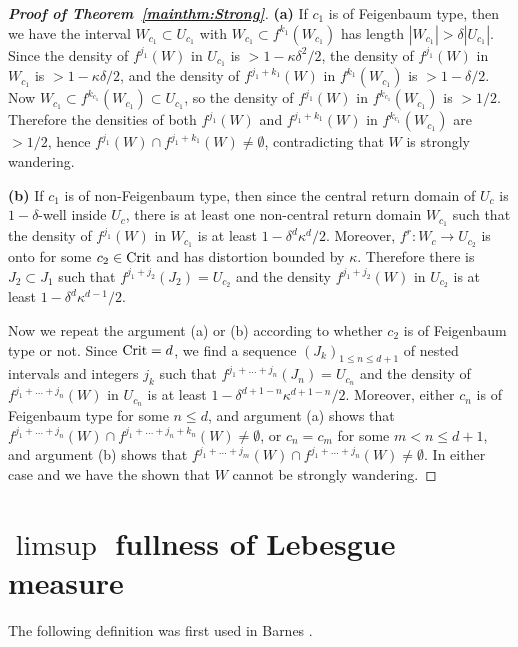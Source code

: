 \documentclass[12pt, psamsfonts, reqno]{amsart}
\begin{document}
\begin{proof}[\textbf{Proof of Theorem~\ref{mainthm:Strong}}]
{\bf (a)} If $c_1$ is of Feigenbaum type, then we have the
interval $W_{c_1} \subset U_{c_1}$ with $W_{c_1} \subset f^{k_1}(W_{c_1})$
has length  $|W_{c_1}| > \delta |U_{c_1}|$.
Since the density of
$f^{j_1}(W)$ in $U_{c_1}$ is $>1-\kappa\delta^2/2$, the density of
$f^{j_1}(W)$ in $W_{c_1}$ is $>1-\kappa\delta/2$, and the
density of $f^{j_1+k_1}(W)$ in $f^{k_1}(W_{c_1})$ is
$>1-\delta/2$.
Now  $W_{c_1} \subset f^{k_{c_1}}(W_{c_1}) \subset
U_{c_1}$, so the density of $f^{j_1}(W)$ in $f^{k_{c_1}}(W_{c_1})$
is $>1/2$. Therefore the densities
of both $f^{j_1}(W)$ and $f^{j_1+k_1}(W)$ in
$f^{k_{c_1}}(W_{c_1})$ are $>1/2$, hence  $f^{j_1}(W) \cap
f^{j_1+k_1}(W)\neq \emptyset$, contradicting that $W$ is strongly
wandering.

{\bf (b)} If $c_1$ is of non-Feigenbaum type, then since the central return domain
of $U_c$ is $1-\delta$-well inside $U_c$, there is at least one non-central
return domain $W_{c_1}$ such that the density of $f^{j_1}(W)$ in
$W_{c_1}$ is at least $1-\delta^d\kappa^d/2$.
Moreover, $f^r:W_c \to U_{c_2}$ is onto for some $c_2 \in {\mathop{\rm Crit}\nolimits}$
and has distortion bounded by $\kappa$.
Therefore there is $J_2 \subset J_1$ such that $f^{j_1 + j_2}(J_2) = U_{c_2}$ and
the density $f^{j_1 + j_2}(W)$ in $U_{c_2}$ is at least
$1-\delta^{d}\kappa^{d-1}/2$.

Now we repeat the argument (a) or (b) according to whether $c_2$ is of
Feigenbaum type or not. Since ${\mathop{\rm Crit}\nolimits} = d$,
we find a sequence $(J_k)_{1 \leq n \leq d+1}$ of nested intervals
and integers $j_k$ such that $f^{j_1+\dots + j_n}(J_n) = U_{c_n}$
and the density of $f^{j_1+\dots + j_n}(W)$ in $U_{c_n}$ is at least
$1-\delta^{d+1-n}\kappa^{d+1-n}/2$.
Moreover, either $c_n$ is of Feigenbaum type for some $n \leq d$,
and argument (a) shows that $f^{j_1+\dots + j_n}(W) \cap
f^{j_1+\dots + j_n + k_n}(W) \neq \emptyset$,
or $c_n = c_m$ for some $m < n \leq d+1$, and argument (b)
shows that $f^{j_1+\dots + j_m}(W) \cap
f^{j_1+\dots + j_n}(W) \neq \emptyset$.
In either case and we have the shown that $W$ cannot be strongly wandering.
\end{proof}
\fi

\section{$\limsup$ fullness of Lebesgue measure}\label{sec:limsupfull}

The following definition was first used in Barnes \cite{Bar}.
\end{document}
